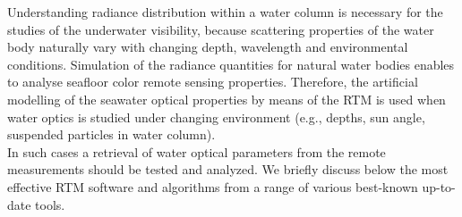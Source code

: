 \documentclass[11pt]{article}
\begin{document}
Understanding radiance distribution within a water column is necessary for the studies of the underwater visibility, because scattering properties of the water body naturally vary with changing depth, wavelength and environmental conditions.  Simulation of the radiance quantities for natural water bodies enables to analyse seafloor color remote sensing properties. Therefore, the artificial modelling of the seawater optical properties by means of the \ac{RTM} is used when water optics is studied under changing environment (e.g., depths, sun angle, suspended particles in water column). \\ In such cases a retrieval of water optical parameters from the remote measurements should be tested and analyzed. 
\newline
We briefly discuss below the most effective RTM software and algorithms from a range of various best-known up-to-date tools. 
\end{document}
